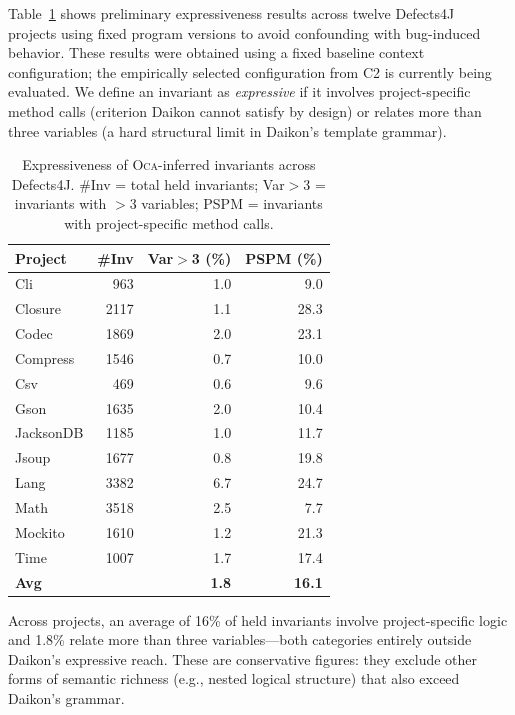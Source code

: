 \documentclass[sigplan,screen]{acmart}
\begin{document}
Table~\ref{tab:expr} shows preliminary expressiveness results
across twelve Defects4J~\cite{just2014defects4j} projects
using fixed program versions to avoid confounding with bug-induced behavior.
These results were obtained using a fixed baseline context configuration;
the empirically selected configuration from C2 is currently being evaluated.
We define an invariant as \emph{expressive} if it involves project-specific method calls
(criterion Daikon cannot satisfy by design)
or relates more than three variables
(a hard structural limit in Daikon's template grammar).

\begin{table}[h]
\centering
\caption{Expressiveness of \textsc{Oca}-inferred invariants across Defects4J.
\#Inv = total held invariants; Var$>$3 = invariants with $>$3 variables;
PSPM = invariants with project-specific method calls.}
\label{tab:expr}
\footnotesize
\begin{tabular*}{\columnwidth}{@{\extracolsep{\fill}}lrrr@{}}
\hline
\textbf{Project} & \textbf{\#Inv} & \textbf{Var$>$3 (\%)} & \textbf{PSPM (\%)} \\
\hline
Cli       &   963 &  1.0 &  9.0 \\
Closure   &  2117 &  1.1 & 28.3 \\
Codec     &  1869 &  2.0 & 23.1 \\
Compress  &  1546 &  0.7 & 10.0 \\
Csv       &   469 &  0.6 &  9.6 \\
Gson      &  1635 &  2.0 & 10.4 \\
JacksonDB &  1185 &  1.0 & 11.7 \\
Jsoup     &  1677 &  0.8 & 19.8 \\
Lang      &  3382 &  6.7 & 24.7 \\
Math      &  3518 &  2.5 &  7.7 \\
Mockito   &  1610 &  1.2 & 21.3 \\
Time      &  1007 &  1.7 & 17.4 \\
\hline
\textbf{Avg} & & \textbf{1.8} & \textbf{16.1} \\
\hline
\end{tabular*}
\end{table}

Across projects, an average of 16\% of held invariants involve project-specific logic
and 1.8\% relate more than three variables---both categories
entirely outside Daikon's expressive reach.
These are conservative figures: they exclude other forms of semantic richness
(e.g., nested logical structure) that also exceed Daikon's grammar.
\end{document}
